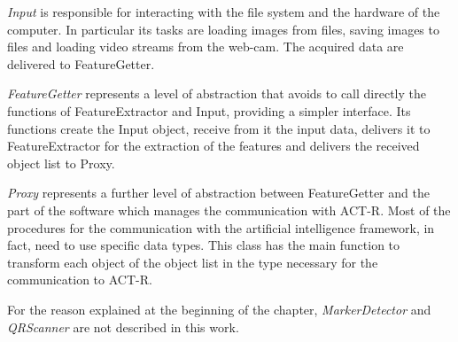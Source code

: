 	\emph{Input} is responsible for interacting with the file system and the hardware of the computer. In particular its tasks are loading images from files, saving images to files and loading video streams from the web-cam. The acquired data are delivered to FeatureGetter. 

	\emph{FeatureGetter} represents a level of abstraction that avoids to call directly the functions of FeatureExtractor and Input, providing a simpler interface. Its functions create the Input object, receive from it the input data, delivers it to FeatureExtractor for the extraction of the features and delivers the received object list to Proxy.

	\emph{Proxy} represents a further level of abstraction between FeatureGetter and the part of the software which manages the communication with ACT-R. Most of the procedures for the communication with the artificial intelligence framework, in fact, need to use specific data types. This class has the main function to transform each object of the object list in the type necessary for the communication to ACT-R.

	For the reason explained at the beginning of the chapter, \emph{MarkerDetector} and \emph{QRScanner} are not described in this work.

